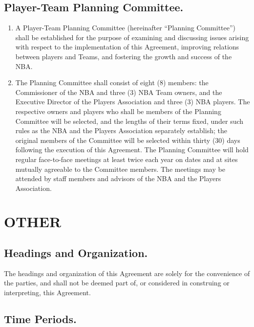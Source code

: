 \documentclass[
]{book}
\providecommand{\tightlist}{%
  \setlength{\itemsep}{0pt}\setlength{\parskip}{0pt}}
\begin{document}
\hypertarget{player-team-planning-committee.}{%
\section{Player-Team Planning Committee.}\label{player-team-planning-committee.}}

\begin{enumerate}
\def\labelenumi{(\alph{enumi})}
\tightlist
\item
  A Player-Team Planning Committee (hereinafter ``Planning Committee'') shall be established for the purpose of examining and discussing issues arising with respect to the implementation of this Agreement, improving relations between players and Teams, and fostering the growth and success of the NBA.
\item
  The Planning Committee shall consist of eight (8) members: the Commissioner of the NBA and three (3) NBA Team owners, and the Executive Director of the Players Association and three (3) NBA players. The respective owners and players who shall be members of the Planning Committee will be selected, and the lengths of their terms fixed, under such rules as the NBA and the Players Association separately establish; the original members of the Committee will be selected within thirty (30) days following the execution of this Agreement. The Planning Committee will hold regular face-to-face meetings at least twice each year on dates and at sites mutually agreeable to the Committee members. The meetings may be attended by staff members and advisors of the NBA and the Players Association.
\end{enumerate}

\hypertarget{other}{%
\chapter{OTHER}\label{other}}

\hypertarget{headings-and-organization.}{%
\section{Headings and Organization.}\label{headings-and-organization.}}

The headings and organization of this Agreement are solely for the convenience of the parties, and shall not be deemed part of, or considered in construing or interpreting, this Agreement.

\hypertarget{time-periods.}{%
\section{Time Periods.}\label{time-periods.}}
\end{document}

